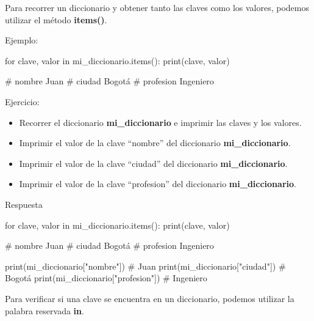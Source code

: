 \documentclass[
  a4paper,
  DIV=11,
  numbers=noendperiod,
  onepage,
  openany]{scrreprt}
\newenvironment{Shaded}{\begin{snugshade}}{\end{snugshade}}
\newcommand{\BuiltInTok}[1]{\textcolor[rgb]{0.00,0.23,0.31}{#1}}
\newcommand{\CommentTok}[1]{\textcolor[rgb]{0.37,0.37,0.37}{#1}}
\newcommand{\ControlFlowTok}[1]{\textcolor[rgb]{0.00,0.23,0.31}{#1}}
\newcommand{\KeywordTok}[1]{\textcolor[rgb]{0.00,0.23,0.31}{#1}}
\newcommand{\NormalTok}[1]{\textcolor[rgb]{0.00,0.23,0.31}{#1}}
\newcommand{\StringTok}[1]{\textcolor[rgb]{0.13,0.47,0.30}{#1}}
\providecommand{\tightlist}{%
  \setlength{\itemsep}{0pt}\setlength{\parskip}{0pt}}\usepackage{longtable,booktabs,array}
\begin{document}
Para recorrer un diccionario y obtener tanto las claves como los
valores, podemos utilizar el método \textbf{items()}.

Ejemplo:

\begin{Shaded}
\begin{Highlighting}[]
\ControlFlowTok{for}\NormalTok{ clave, valor }\KeywordTok{in}\NormalTok{ mi\_diccionario.items():}
    \BuiltInTok{print}\NormalTok{(clave, valor)}

\CommentTok{\# nombre Juan}
\CommentTok{\# ciudad Bogotá}
\CommentTok{\# profesion Ingeniero}
\end{Highlighting}
\end{Shaded}

Ejercicio:

\begin{itemize}
\tightlist
\item
  Recorrer el diccionario \textbf{mi\_diccionario} e imprimir las claves
  y los valores.
\item
  Imprimir el valor de la clave ``nombre'' del diccionario
  \textbf{mi\_diccionario}.
\item
  Imprimir el valor de la clave ``ciudad'' del diccionario
  \textbf{mi\_diccionario}.
\item
  Imprimir el valor de la clave ``profesion'' del diccionario
  \textbf{mi\_diccionario}.
\end{itemize}

Respuesta

\begin{Shaded}
\begin{Highlighting}[]
\ControlFlowTok{for}\NormalTok{ clave, valor }\KeywordTok{in}\NormalTok{ mi\_diccionario.items():}
    \BuiltInTok{print}\NormalTok{(clave, valor)}

\CommentTok{\# nombre Juan}
\CommentTok{\# ciudad Bogotá}
\CommentTok{\# profesion Ingeniero}

\BuiltInTok{print}\NormalTok{(mi\_diccionario[}\StringTok{"nombre"}\NormalTok{])  }\CommentTok{\# Juan}
\BuiltInTok{print}\NormalTok{(mi\_diccionario[}\StringTok{"ciudad"}\NormalTok{])  }\CommentTok{\# Bogotá}
\BuiltInTok{print}\NormalTok{(mi\_diccionario[}\StringTok{"profesion"}\NormalTok{])  }\CommentTok{\# Ingeniero}
\end{Highlighting}
\end{Shaded}

Para verificar si una clave se encuentra en un diccionario, podemos
utilizar la palabra reservada \textbf{in}.
\end{document}
